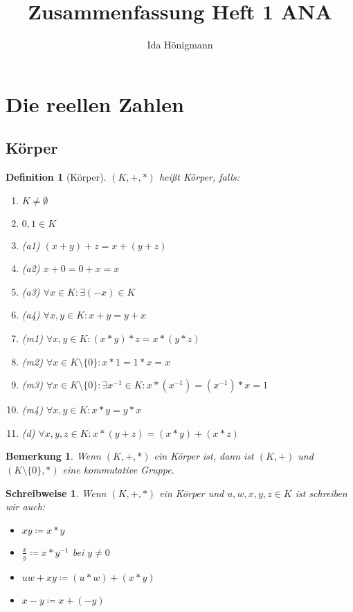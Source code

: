 \documentclass[twocolumn]{article}
\title{Zusammenfassung Heft 1 ANA}
\author{Ida Hönigmann}
\newtheorem{definition}{Definition}[section]
\newtheorem*{remark}{Bemerkung}
\newtheorem*{schreibweise}{Schreibweise}
\begin{document}
\maketitle

\section{Die reellen Zahlen}
\subsection{Körper}
\begin{definition}[Körper]
	$(K,+,*)$ heißt Körper, falls:
	\begin{enumerate}
		\item $K \neq \emptyset$
		\item $0,1 \in K$
		\item (a1) $(x+y)+z = x+(y+z)$
		\item (a2) $x+0=0+x=x$
		\item (a3) $\forall x \in K : \exists (-x) \in K$
		\item (a4) $\forall x,y \in K : x+y=y+x$
		\item (m1) $\forall x,y \in K : (x * y)*z = x*(y*z)$
		\item (m2) $\forall x \in K\setminus \{0\} : x*1=1*x=x$
		\item (m3) $\forall x \in K\setminus \{0\} : \exists x^{-1} \in K : x * (x^{-1}) = (x^{-1}) * x = 1$
		\item (m4) $\forall x,y \in K : x * y = y * x$
		\item (d) $\forall x,y,z \in K : x*(y+z) = (x*y)+(x*z)$
	\end{enumerate}
\end{definition}

\begin{remark}
	Wenn $(K,+,*)$ ein Körper ist, dann ist $(K,+)$ und $(K \setminus \{0\}, *)$ eine kommutative Gruppe.
\end{remark}

\begin{schreibweise}
	Wenn $(K,+,*)$ ein Körper und $u,w,x,y,z \in K$ ist schreiben wir auch:
	\begin{itemize}
		\item $xy \coloneqq x * y$
		\item $\frac{x}{y} \coloneqq x * y^{-1}$ bei $y \neq 0$
		\item $uw+xy \coloneqq (u * w) + (x * y)$
		\item $x - y \coloneqq x + (-y)$
	\end{itemize}
\end{schreibweise}
\end{document}
